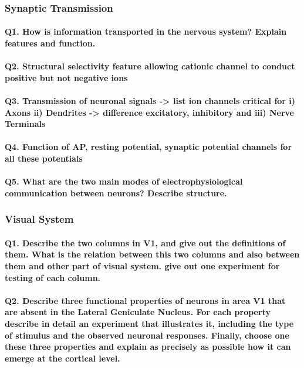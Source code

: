 \documentclass[12pt,article,oneside,a4paper]{memoir}
\begin{document}
\subsubsection{Synaptic Transmission}
\paragraph{Q1. How is information transported in the nervous system? Explain features and function.}
\paragraph{Q2. Structural selectivity feature allowing cationic channel to conduct positive but not negative ions}
\paragraph{Q3. Transmission of neuronal signals -> list ion channels critical for i) Axons ii) Dendrites -> difference excitatory, inhibitory and iii) Nerve Terminals}
\paragraph{Q4. Function of AP, resting potential, synaptic potential channels for all these potentials}
\paragraph{Q5. What are the two main modes of electrophysiological communication between neurons? Describe structure.}

\subsubsection{Visual System}
\paragraph{Q1. Describe the two columns in V1, and give out the definitions of them. What is the relation between this two columns and also between them and other part of visual system. give out one experiment for testing of each column.}
\paragraph{Q2. Describe three functional properties of neurons in area V1 that are absent in the Lateral Geniculate Nucleus. For each property describe in detail an experiment that illustrates it, including the type of stimulus and the observed neuronal responses. Finally, choose one these three properties and explain as precisely as possible how it can emerge at the cortical level.}
\end{document}
